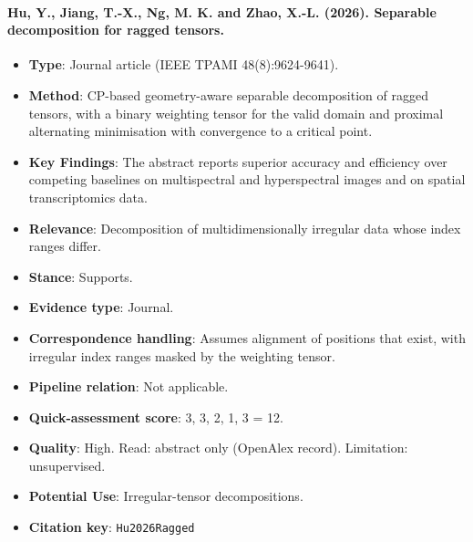 \documentclass[journal,onecolumn]{IEEEtran}
\begin{document}
\paragraph{Hu, Y., Jiang, T.-X., Ng, M. K. and Zhao, X.-L. (2026). Separable decomposition for ragged tensors.~\cite{Hu2026Ragged}}\mbox{}

\begin{itemize}

\item{} \textbf{Type}: Journal article (IEEE TPAMI 48(8):9624-9641).

\item{} \textbf{Method}: CP-based geometry-aware separable decomposition of ragged tensors, with a binary weighting tensor for the valid domain and proximal alternating minimisation with convergence to a critical point.

\item{} \textbf{Key Findings}: The abstract reports superior accuracy and efficiency over competing baselines on multispectral and hyperspectral images and on spatial transcriptomics data.

\item{} \textbf{Relevance}: Decomposition of multidimensionally irregular data whose index ranges differ.

\item{} \textbf{Stance}: Supports.

\item{} \textbf{Evidence type}: Journal.

\item{} \textbf{Correspondence handling}: Assumes alignment of positions that exist, with irregular index ranges masked by the weighting tensor.

\item{} \textbf{Pipeline relation}: Not applicable.

\item{} \textbf{Quick-assessment score}: 3, 3, 2, 1, 3 = 12.

\item{} \textbf{Quality}: High. Read: abstract only (OpenAlex record). Limitation: unsupervised.

\item{} \textbf{Potential Use}: Irregular-tensor decompositions.

\item{} \textbf{Citation key}: \texttt{Hu2026Ragged}

\end{itemize}
\end{document}
